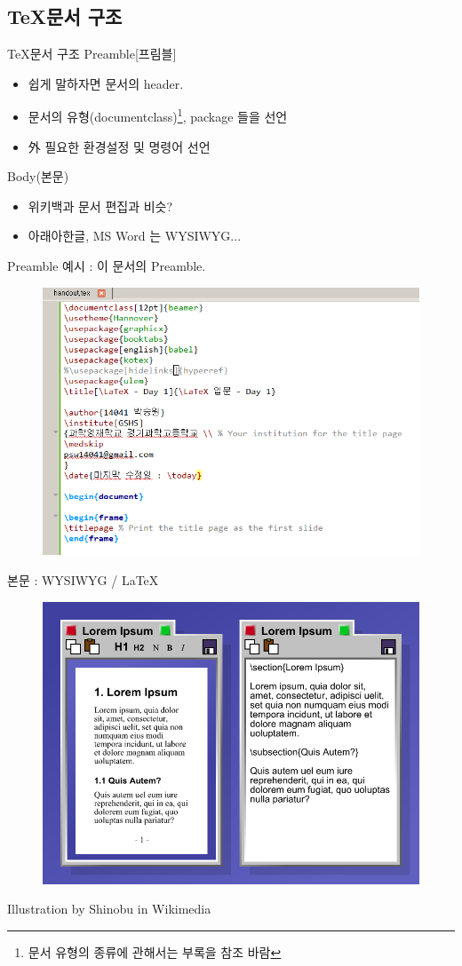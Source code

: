 \documentclass[12pt]{beamer}
\begin{document}
\subsection{\TeX 문서 구조}
\begin{frame}{\TeX 문서 구조}
	Preamble[프림블]
	\begin{itemize}
		\item 쉽게 말하자면 문서의 header.
		\item 문서의 유형(documentclass)\footnote{문서 유형의 종류에 관해서는 부록을 참조 바람}, package 들을 선언
		\item 外 필요한 환경설정 및 명령어 선언
	\end{itemize}
	Body(본문)
	\begin{itemize}
		\item 위키백과 문서 편집과 비슷?
		\item 아래아한글, MS Word 는 WYSIWYG...
	\end{itemize}
\end{frame}
\begin{frame}{Preamble}
	예시 : 이 문서의 Preamble. 
	\begin{figure}
		\centering
		\includegraphics[width=.9\textwidth]{texception.png}
	\end{figure}
\end{frame}
\begin{frame}{본문 : WYSIWYG / \LaTeX}
	\begin{figure}
		\centering
		\includegraphics[width=.9\textwidth]{wysiwyg.png}
	\end{figure}
	Illustration by Shinobu in Wikimedia
\end{frame}
\end{document}
